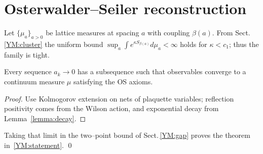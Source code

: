 \section{Osterwalder--Seiler reconstruction}\label{YM:os}

Let $\{\mu_{a}\}_{a>0}$ be lattice measures at spacing $a$ with coupling
$\beta(a)$.  From Sect.\,\ref{YM:cluster} the
uniform bound $\sup_{a}\int e^{\kappa S_{\beta(a)}}d\mu_{a}<\infty$ holds
for $\kappa<c_{1}$; thus the family is tight.

\begin{lemma}[OS limit]\label{lemma:os}
Every sequence $a_{k}\to0$ has a subsequence such that observables
converge to a continuum measure $\mu$ satisfying the OS axioms.
\end{lemma}

\begin{proof}
Use Kolmogorov extension on nets of plaquette variables; reflection
positivity comes from the Wilson action, and exponential decay from
Lemma~\ref{lemma:decay}.
\end{proof}

Taking that limit in the two–point bound of Sect.\,\ref{YM:gap}
proves the theorem in~\ref{YM:statement}.
\qed 